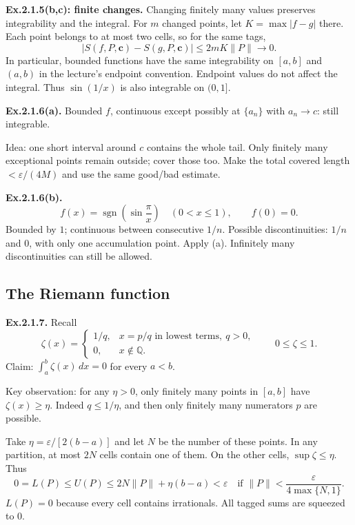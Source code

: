 \documentclass[11pt,letterpaper]{article}
\begin{document}
\textbf{Ex.2.1.5(b,c): finite changes.} Changing finitely many values
preserves integrability and the integral. For \(m\) changed points, let
\(K=\max|f-g|\) there. Each point belongs to at most two cells, so for
the same tags, \[
|S(f,P,\mathbf c)-S(g,P,\mathbf c)|\le2mK\|P\|\to0.
\] In particular, bounded functions have the same integrability on
\([a,b]\) and \((a,b)\) in the lecture's endpoint convention. Endpoint
values do not affect the integral. Thus \(\sin(1/x)\) is also integrable
on \((0,1]\).

\textbf{Ex.2.1.6(a).} Bounded \(f\), continuous except possibly at
\(\{a_n\}\) with \(a_n\to c\): still integrable.

Idea: one short interval around \(c\) contains the whole tail. Only
finitely many exceptional points remain outside; cover those too. Make
the total covered length \(<\varepsilon/(4M)\) and use the same good/bad
estimate.

\textbf{Ex.2.1.6(b).} \[
f(x)=\operatorname{sgn}\!\left(\sin\frac{\pi}{x}\right)\quad(0<x\le1),
\qquad f(0)=0.
\] Bounded by \(1\); continuous between consecutive \(1/n\). Possible
discontinuities: \(1/n\) and \(0\), with only one accumulation point.
Apply (a). Infinitely many discontinuities can still be allowed.

\newpage

\subsection{The Riemann function}\label{the-riemann-function}

\textbf{Ex.2.1.7.} Recall \[
\zeta(x)=\begin{cases}
1/q,&x=p/q\text{ in lowest terms},\ q>0,\\
0,&x\notin\mathbb Q.
\end{cases}
\qquad 0\le\zeta\le1.
\] Claim: \(\displaystyle\int_a^b\zeta(x)\,dx=0\) for every \(a<b\).

Key observation: for any \(\eta>0\), only finitely many points in
\([a,b]\) have \(\zeta(x)\ge\eta\). Indeed \(q\le1/\eta\), and then only
finitely many numerators \(p\) are possible.

Take \(\eta=\varepsilon/[2(b-a)]\) and let \(N\) be the number of these
points. In any partition, at most \(2N\) cells contain one of them. On
the other cells, \(\sup\zeta\le\eta\). Thus \[
0=L(P)\le U(P)
\le 2N\|P\|+\eta(b-a)<\varepsilon
\quad\text{if }\|P\|<\frac{\varepsilon}{4\max\{N,1\}}.
\] \(L(P)=0\) because every cell contains irrationals. All tagged sums
are squeezed to \(0\).
\end{document}
